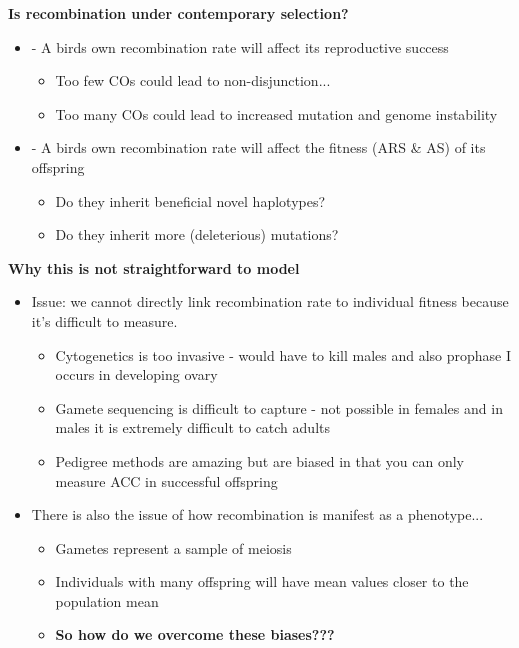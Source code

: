 \documentclass[dvipsnames]{article}
\begin{document}
\textbf{Is recombination under contemporary selection?}
\begin{itemize}
    \item - A birds own recombination rate will affect its reproductive success \begin{itemize}
        \item Too few COs could lead to non-disjunction...
        \item Too many COs could lead to increased mutation and genome instability
    \end{itemize}
    \item - A birds own recombination rate will affect the fitness (ARS \& AS) of its offspring \begin{itemize}
        \item Do they inherit beneficial novel haplotypes?
        \item Do they inherit more (deleterious) mutations?
    \end{itemize}
\end{itemize}

\textbf{Why this is not straightforward to model} 
\begin{itemize}
    \item Issue: we cannot directly link recombination rate to individual fitness because it's difficult to measure. \begin{itemize}
        \item Cytogenetics is too invasive - would have to kill males and also prophase I occurs in developing ovary
        \item Gamete sequencing is difficult to capture - not possible in females and in males it is extremely difficult to catch adults
        \item Pedigree methods are amazing but are biased in that you can only measure ACC in successful offspring
    \end{itemize}
    \item There is also the issue of how recombination is manifest as a phenotype... \begin{itemize}
        \item Gametes represent a sample of meiosis
        \item Individuals with many offspring will have mean values closer to the population mean
        \item \textbf{So how do we overcome these biases???}
    \end{itemize}
\end{itemize}
\end{document}
